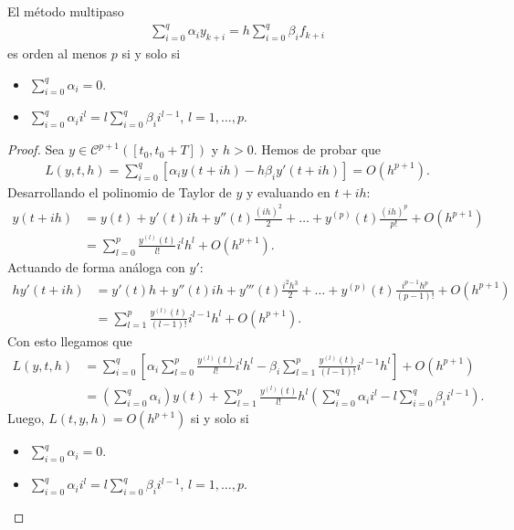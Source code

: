 \begin{teo}
    El método multipaso
    \begin{align*}
        \sum_{i=0}^{q} \alpha_i y_{k+i} = h\sum_{i=0}^{q} \beta_i f_{k+i}
    \end{align*}
    es orden al menos $p$ si y solo si
    \begin{itemize}
        \item $\sum_{i=0}^{q} \alpha_i = 0$.
        \item $\sum_{i=0}^{q} \alpha_i i^l = l\sum_{i=0}^{q} \beta_i i^{l-1}$, $l = 1,\ldots,p$.
    \end{itemize}
\end{teo}

\begin{proof}
    Sea $y \in \mathcal{C}^{p+1}([t_0,t_0+T])$ y $h > 0$.  Hemos de probar que
    \begin{align*}
        L(y,t,h) = \sum_{i=0}^{q}[\alpha_i y(t+ih) - h\beta_i y'(t+ih)] = O(h^{p+1}).
    \end{align*}
    Desarrollando el polinomio de Taylor de $y$ y evaluando en $t+ih$:
    \begin{align*}
        y(t+ih) & = y(t) + y'(t)ih + y''(t)\frac{(ih)^2}{2} + \ldots + y^{(p)}(t)\frac{(ih)^p}{p!} + O(h^{p+1}) \\
                & = \sum_{l=0}^{p} \frac{y^{(l)}(t)}{l!}i^lh^l + O(h^{p+1}).
    \end{align*}
    Actuando de forma análoga con $y'$:
    \begin{align*}
        hy'(t+ih) & = y'(t)h + y''(t)ih + y'''(t)\frac{i^2h^3}{2} + \ldots + y^{(p)}(t)\frac{i^{p-1}h^p}{(p-1)!} + O(h^{p+1}) \\
                  & = \sum_{l=1}^{p} \frac{y^{(l)}(t)}{(l-1)!}i^{l-1}h^l + O(h^{p+1}).
    \end{align*}
    Con esto llegamos que
    \begin{align*}
        L(y,t,h) & = \sum_{i=0}^{q} \left[ \alpha_i \sum_{l=0}^{p} \frac{y^{(l)}(t)}{l!}i^lh^l - \beta_i \sum_{l=1}^{p} \frac{y^{(l)}(t)}{(l-1)!}i^{l-1}h^l \right] + O(h^{p+1})        \\
                 & = \left( \sum_{i=0}^{q} \alpha_i \right) y(t) + \sum_{l=1}^{p} \frac{y^{(l)}(t)}{l!}h^l\left( \sum_{i=0}^{q} \alpha_i i^l - l\sum_{i=0}^{q} \beta_i i^{l-1} \right).
    \end{align*}
    Luego, $L(t,y,h) = O(h^{p+1})$ si y solo si
    \begin{itemize}
        \item $\sum_{i=0}^{q} \alpha_i = 0$.
        \item $\sum_{i=0}^{q} \alpha_i i^l = l\sum_{i=0}^{q} \beta_i i^{l-1}$, $l = 1,\ldots,p$.
    \end{itemize}
\end{proof}

